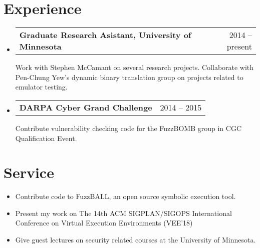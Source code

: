 \documentclass[letterpaper,11pt]{article}
\makeatletter
\newcommand{\myitem}[1]{
  \item[-]\small{
    { #1 \vspace{-2pt}}
  }
}
\newcommand{\project}[3]{
  \vspace{-1pt}\item[]
  \begin{tabular*}{0.97\textwidth}{l@{\extracolsep{\fill}}r}
  \textbf{\small#1} & {\small#2}\\
  \end{tabular*}
      {\small#3}\vspace{-5pt}
}
\newcommand{\content}{\begin{itemize}[leftmargin=0px]}
\newcommand{\contentend}{\end{itemize}}
\newcommand{\mylist}{\begin{itemize}[leftmargin=25px,rightmargin=25px]}
\newcommand{\mylistend}{\end{itemize}\vspace{-5pt}}
\makeatother
\begin{document}
%
\section{Experience}
  \content
  \project
      {Graduate Research Asistant, University of Minnesota}{2014 -- present}
      {Work with Stephen McCamant on several research projects. 
      Collaborate with Pen-Chung Yew's dynamic binary translation group on projects related to emulator testing.}    
    \project
      {DARPA Cyber Grand Challenge}{2014 -- 2015}
      {Contribute vulnerability checking code for the FuzzBOMB group in CGC Qualification Event.}  
  \contentend

   
\section{Service}
\mylist
\myitem{Contribute code to FuzzBALL, an open source symbolic execution tool.}
\myitem{Present my work on The 14th ACM SIGPLAN/SIGOPS International Conference on Virtual Execution Environments (VEE'18)}
\myitem{Give guest lectures on security related courses at the University of Minnesota.}
\mylistend



\end{document}
